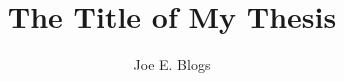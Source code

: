 \documentclass[12pt,a4paper,fleqn]{report}
\title{The Title of My Thesis}
\author{Joe E. Blogs}
\begin{document}
% 

\beforeabstract





\afterabstract










\pagestyle{fancy}
\renewcommand{\chaptermark}[1]{\markboth{Chapter \thechapter: #1}{}}






\label{refs}



\appendix
\renewcommand{\chaptermark}[1]{\markboth{Appendix \thechapter: #1}{}}

\end{document}
